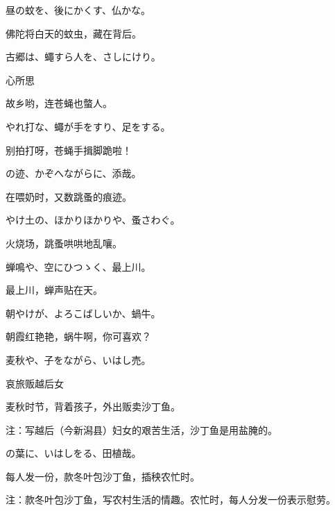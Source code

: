 \begin{haiku}
    {\FH 昼の蚊を、後にかくす、仏かな。}

    {\FK 佛陀将白天的蚊虫，藏在背后。}
\end{haiku}

\begin{haiku}
    {\FH 古郷は、蠅すら人を、さしにけり。}

    {\FK 心所思}

    {\FK 故乡哟，连苍蝇也螫人。}
\end{haiku}

\begin{haiku}
    {\FH やれ打な、蠅が手をすり、足をする。}

    {\FK 别拍打呀，苍蝇手揖脚跪啦！}
\end{haiku}

\begin{haiku}
    {\FH {}の迹、かぞへながらに、添哉。}

    {\FK 在喂奶时，又数跳蚤的痕迹。}
\end{haiku}

\begin{haiku}
    {\FH やけ土の、ほかりほかりや、蚤さわぐ。}

    {\FK 火烧场，跳蚤哄哄地乱嚷。}
\end{haiku}

\begin{haiku}
    {\FH 蝉鳴や、空にひつゝく、最上川。}

    {\FK 最上川，蝉声贴在天。}
\end{haiku}

\begin{haiku}
    {\FH 朝やけが、よろこばしいか、蝸牛。}

    {\FK 朝霞红艳艳，蜗牛啊，你可喜欢？}
\end{haiku}

\begin{haiku}
    {\FH 麦秋や、子をながら、いはし売。}

    {\FK 哀旅贩越后女}

    {\FK 麦秋时节，背着孩子，外出贩卖沙丁鱼。}

    {\FT 注：写越后（今新潟县）妇女的艰苦生活，沙丁鱼是用盐腌的。}
\end{haiku}

\begin{haiku}
    {\FH {}の葉に、いはしをる、田植哉。}

    {\FK 每人发一份，款冬叶包沙丁鱼，插秧农忙时。}

    {\FT 注：款冬叶包沙丁鱼，写农村生活的情趣。农忙时，每人分发一份表示慰劳。}
\end{haiku}

